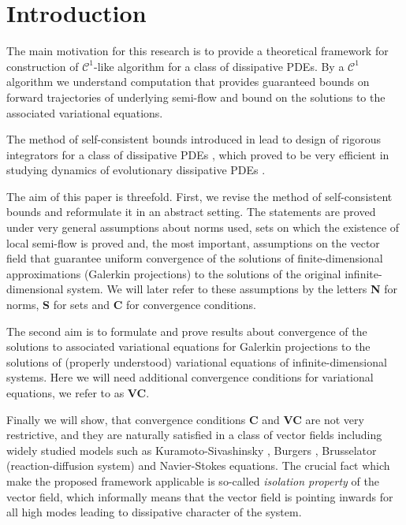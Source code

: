 \section{Introduction}

The main motivation for this research is to provide a theoretical framework for construction of $\mathcal C^1$-like algorithm for a class of dissipative PDEs. By a $\mathcal C^1$ algorithm we understand computation that provides guaranteed bounds on forward trajectories of underlying semi-flow and bound on the solutions to the associated variational equations.

The method of self-consistent bounds introduced in \cite{ZM}  lead to design  of rigorous integrators for a class of dissipative PDEs  \cite{C,WZ,ZKSper,ZKS3}, which  proved to be very efficient in studying dynamics of evolutionary dissipative PDEs \cite{BKZ,WZ,CW,CZ,Z,Z1,ZKSper,ZKS3}.

The aim of this paper is threefold. First, we revise the method of self-consistent bounds and reformulate it in an abstract setting. The statements are proved under very general assumptions about norms used, sets on which the existence of local semi-flow is proved and, the most important, assumptions on the vector field that guarantee uniform convergence of the solutions of finite-dimensional approximations (Galerkin projections) to the solutions of the original infinite-dimensional system. We will later refer to these assumptions by the letters \textbf{N} for norms, \textbf{S} for sets and \textbf{C} for convergence conditions.

The second aim is to formulate and prove results about convergence of the solutions to associated variational equations for Galerkin projections to the solutions of (properly understood) variational equations of infinite-dimensional systems. Here we will need additional convergence conditions for variational equations, we refer to as \textbf{VC}.

Finally we will show, that convergence conditions \textbf{C} and \textbf{VC} are not very restrictive, and they are naturally satisfied in a class of vector fields including widely studied models such as Kuramoto-Sivashinsky  \cite{KT,S}, Burgers \cite{B}, Brusselator (reaction-diffusion system) and Navier-Stokes \cite{T} equations. The crucial fact which make the proposed framework applicable is so-called \emph{isolation property} of the vector field, which informally means that the vector field is pointing inwards for all high modes leading to dissipative character of the system.

